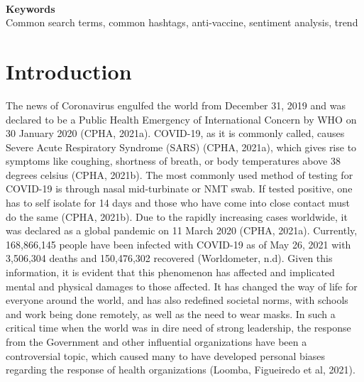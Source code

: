\documentclass[10pt,twocolumn,letterpaper]{article}
\begin{document}
\\ 
\vspace{\baselineskip}
{\textbf{Keywords} \\
Common search terms, common hashtags, anti-vaccine, sentiment analysis, trend }

\section{Introduction}

The news of Coronavirus engulfed the world from December 31, 2019 and was declared to be a Public Health Emergency of International Concern by WHO on 30 January 2020 (CPHA, 2021a). COVID-19, as it is commonly called, causes Severe Acute Respiratory Syndrome (SARS) (CPHA, 2021a), which gives rise to symptoms like coughing, shortness of breath, or body temperatures above 38 degrees celsius (CPHA, 2021b). The most commonly used method of testing for COVID-19 is through nasal mid-turbinate or NMT swab. If tested positive, one has to self isolate for 14 days and those who have come into close contact must do the same (CPHA, 2021b). Due to the rapidly increasing cases worldwide, it was declared as a global pandemic on 11 March 2020 (CPHA, 2021a). Currently, 168,866,145 people have been infected with COVID-19 as of May 26, 2021 with 3,506,304 deaths and 150,476,302 recovered (Worldometer, n.d). Given this information, it is evident that this phenomenon has affected and implicated mental and physical damages to those affected. It has changed the way of life for everyone around the world, and has also redefined societal norms, with schools and work being done remotely, as well as the need to wear masks. In such a critical time when the world was in dire need of strong leadership, the response from the Government and other influential organizations have been a controversial topic, which caused many to have developed personal biases regarding the response of health organizations (Loomba, Figueiredo et al, 2021). 
\end{document}
